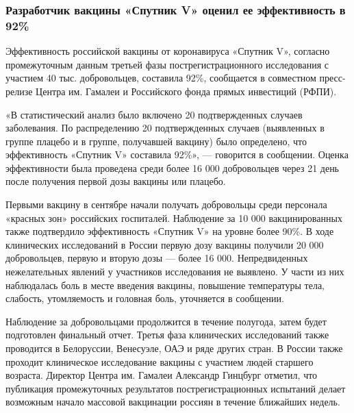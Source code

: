  
 
 


\subsubsection{Разработчик вакцины «Спутник V» оценил ее эффективность в 92\%}
\label{sec:11_11_2020.news.ru.vedomosti_ru.1.vaccine_sputnik_v}

Эффективность российской вакцины от коронавируса «Спутник V», согласно
промежуточным данным третьей фазы пострегистрационного исследования с
участием 40 тыс. добровольцев, составила 92\%, сообщается в совместном
пресс-релизе Центра им. Гамалеи и Российского фонда прямых инвестиций
(РФПИ).

«В статистический анализ было включено 20 подтвержденных случаев
заболевания. По распределению 20 подтвержденных случаев (выявленных в
группе плацебо и в группе, получавшей вакцину) было определено, что
эффективность «Спутник V» составила 92\%», --- говорится в сообщении. Оценка
эффективности была проведена среди более 16 000 добровольцев через 21 день
после получения первой дозы вакцины или плацебо.

Первыми вакцину в сентябре начали получать добровольцы среди персонала
«красных зон» российских госпиталей. Наблюдение за 10 000 вакцинированных
также подтвердило эффективность «Спутник V» на уровне более 90\%. В ходе
клинических исследований в России первую дозу вакцины получили 20 000
добровольцев, первую и вторую дозы --- более 16 000. Непредвиденных
нежелательных явлений у участников исследования не выявлено. У части из
них наблюдалась боль в месте введения вакцины, повышение температуры тела,
слабость, утомляемость и головная боль, уточняется в сообщении.

Наблюдение за добровольцами продолжится в течение полугода, затем будет
подготовлен финальный отчет. Третья фаза клинических исследований также
проводится в Белоруссии, Венесуэле, ОАЭ и ряде других стран. В России
также проходит клиническое исследование вакцины с участием людей старшего
возраста. Директор Центра им. Гамалеи Александр Гинцбург отметил, что
публикация промежуточных результатов пострегистрационных испытаний делает
возможным начало массовой вакцинации россиян в течение ближайших недель.

